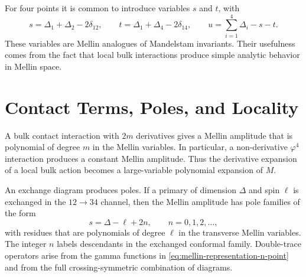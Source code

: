 For four points it is common to introduce variables \(s\) and \(t\), with
\[
  s=\Delta_1+\Delta_2-2\delta_{12},
  \qquad
  t=\Delta_1+\Delta_4-2\delta_{14},
  \qquad
  u=\sum_{i=1}^4\Delta_i-s-t.
\]
These variables are Mellin analogues of Mandelstam invariants.  Their
usefulness comes from the fact that local bulk interactions produce simple
analytic behavior in Mellin space.

\section{Contact Terms, Poles, and Locality}

A bulk contact interaction with \(2m\) derivatives gives a Mellin amplitude
that is polynomial of degree \(m\) in the Mellin variables.  In particular, a
non-derivative \(\varphi^4\) interaction produces a constant Mellin
amplitude.  Thus the derivative expansion of a local bulk action becomes a
large-variable polynomial expansion of \(M\).

An exchange diagram produces poles.  If a primary of dimension \(\Delta\) and
spin \(\ell\) is exchanged in the \(12\to34\) channel, then the Mellin
amplitude has pole families of the form
\begin{equation}
  s=\Delta-\ell+2n,
  \qquad
  n=0,1,2,\ldots ,
  \label{eq:mellin-exchange-pole-family}
\end{equation}
with residues that are polynomials of degree \(\ell\) in the transverse
Mellin variables.  The integer \(n\) labels descendants in the exchanged
conformal family.  Double-trace operators arise from the gamma functions in
\eqref{eq:mellin-representation-n-point} and from the full crossing-symmetric
combination of diagrams.

